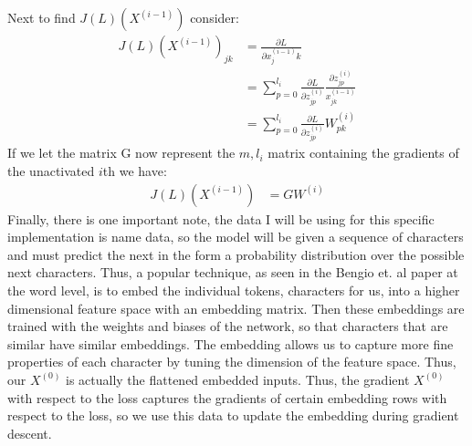 \documentclass[12pt]{article}
\begin{document}
Next to find $J(L)(X^{(i-1)})$ consider:
\begin{align*}
    J(L)(X^{(i-1)})_{jk} &= \frac{\partial L}{\partial x^{(i-1)}_jk} \\
    &= \sum_{p = 0}^{l_i}\frac{\partial L}{\partial z^{(i)}_{jp}}\frac{\partial z^{(i)}_{jp}}{x^{(i-1)}_{jk}} \\
    &= \sum_{p = 0}^{l_i}\frac{\partial L}{\partial z^{(i)}_{jp}}W^{(i)}_{pk}
\end{align*}
If we let the matrix G now represent the $m, l_i$ matrix containing the gradients
of the unactivated $i$th we have:
\begin{align*}
    J(L)(X^{(i-1)}) &= GW^{(i)}
\end{align*}
Finally, there is one important note, the data I will be using for this specific
implementation is name data, so the model will be given a sequence of characters
and must predict the next in the form a probability distribution over the possible next characters.
Thus, a popular technique, as seen in the Bengio et. al paper at the word level, is to embed
the individual tokens, characters for us, into a higher dimensional feature space
with an embedding matrix. Then these embeddings are trained with the weights and biases
of the network, so that characters that are similar have similar embeddings. The embedding
allows us to capture more fine properties of each character by tuning the dimension of the
feature space. Thus, our $X^{(0)}$ is actually the flattened embedded inputs. Thus, the
gradient $X^{(0)}$ with respect to the loss captures the gradients of certain
embedding rows with respect to the loss, so we use this data to update the embedding
during gradient descent.
\end{document}
